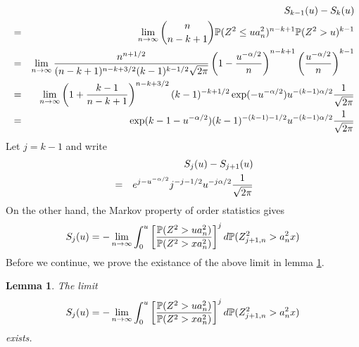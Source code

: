 \documentclass[11pt,reqno]{amsart}
\renewcommand{\P}{\mathbb{P}}
\newcommand{\1}{\mathds{1}}
\newcommand{\0}{\boldsymbol{0}}
\newcommand{\4}{\mathchoice{\mskip1.5mu}{\mskip1.5mu}{}{}}
\newcommand{\5}{\mathchoice{\mskip-1.5mu}{\mskip-1.5mu}{}{}}
\newcommand{\2}{\penalty250\mskip\thickmuskip\mskip-\thinmuskip} %
\newtheorem{lemma}{Lemma}[section]
\begin{document}
\begin{eqnarray*}
  && S_{k-1}(u) - S_k(u) \\  
  &=& \lim_{n \to \infty} {n \choose n-k+1} \P(Z^2 \leq ua_n^2)^{n-k+1} \P(Z^2 > u)^{k-1} \\
  &=& \lim_{n \to \infty} {n^{n+1/2} \over (n-k+1)^{n-k+3/2}
    (k-1)^{k-1/2} \sqrt{2 \pi}} \left(1 -
    {u^{-\alpha/2} \over n}\right)^{n-k+1} \left({u^{-\alpha/2} \over
      n}\right)^{k-1} \\
  &=& \lim_{n \to \infty} \left(
    1 + {k - 1 \over n - k + 1}
  \right)^{n-k+3/2} (k-1)^{-k+1/2}
  \exp(-u^{-\alpha/2})u^{-(k-1)\alpha/2} {1 \over \sqrt{2 \pi}}\\
  &=& \exp(k-1 - u^{-\alpha/2})(k-1)^{-(k-1)-1/2}
  u^{-(k-1)\alpha/2} {1 \over \sqrt{2 \pi}}
\end{eqnarray*}
Let $j = k-1$ and write
\begin{eqnarray}
  && S_{j}(u) - S_{j+1}(u) \nonumber \\
  &=& e^{j - u^{-\alpha/2}} j^{-j-1/2} u^{-j\alpha/2} {1 \over
    \sqrt{2 \pi}} \label{eq:A}
\end{eqnarray}
On the other hand, the Markov property of order statistics gives
\[
  S_j(u) = -\lim_{n \to \infty}\int_{0}^u \left[
    {\P(Z^2 > ua_n^2) \over \P(Z^2 > xa_n^2)}
    \right]^j d\P(Z_{j+1, n}^2 > a_n^2 x) 
\]
Before we continue, we prove the existance of the above limit in lemma \ref{lem:A}.
\begin{lemma}\label{lem:A}
  The limit
\[
S_j(u) = -\lim_{n \to \infty}\int_{0}^u \left[
  {\P(Z^2 > ua_n^2) \over \P(Z^2 > xa_n^2)}
\right]^j d\P(Z_{j+1, n}^2 > a_n^2 x)
\]
exists.
\end{lemma}
\end{document}
